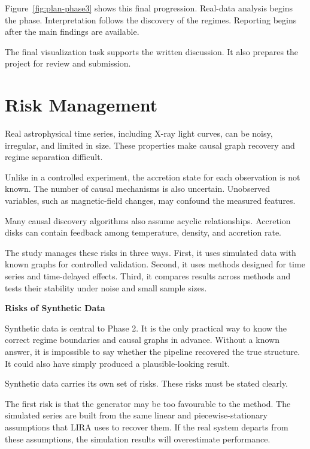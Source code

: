 Figure~\ref{fig:plan-phase3} shows this final progression. Real-data analysis begins
the phase. Interpretation follows the discovery of the regimes. Reporting begins
after the main findings are available.

The final visualization task supports the written discussion. It also prepares the
project for review and submission.

\section{Risk Management}

\vspace{0.3cm}
Real astrophysical time series, including X-ray light curves, can be noisy, irregular,
and limited in size. These properties make causal graph recovery and regime
separation difficult.

Unlike in a controlled experiment, the accretion state for each observation is not known.
The number of causal mechanisms is also uncertain. Unobserved variables, such as
magnetic-field changes, may confound the measured features.

Many causal discovery algorithms also assume acyclic relationships. Accretion disks
can contain feedback among temperature, density, and accretion rate.

The study manages these risks in three ways. First, it uses simulated data with known
graphs for controlled validation. Second, it uses methods designed for time series and
time-delayed effects. Third, it compares results across methods and tests their
stability under noise and small sample sizes.

\vspace{0.5cm}
\textbf{Risks of Synthetic Data}

Synthetic data is central to Phase 2. It is the only practical way to know the
correct regime boundaries and causal graphs in advance. Without a known answer, it is
impossible to say whether the pipeline recovered the true structure. It could also
have simply produced a plausible-looking result.

Synthetic data carries its own set of risks. These risks must be stated clearly.

The first risk is that the generator may be too favourable to the method. The
simulated series are built from the same linear and piecewise-stationary assumptions
that LIRA uses to recover them. If the real system departs from these assumptions,
the simulation results will overestimate performance.

